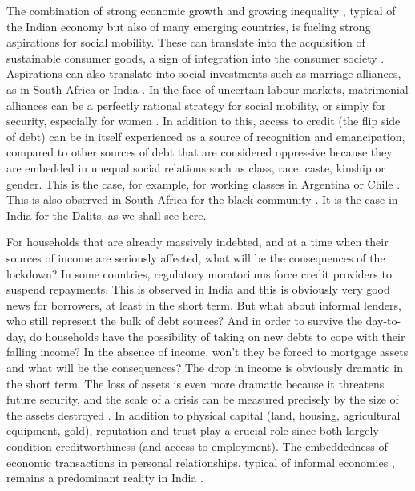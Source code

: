 \documentclass[a4paper, 11pt, onecolumn]{article}
\begin{document}
The combination of strong economic growth and growing inequality \citep{Chancel2019}, typical of the Indian economy but also of many emerging countries, is fueling strong aspirations for social mobility. 
These can translate into the acquisition of sustainable consumer goods, a sign of integration into the consumer society \citep{Saiag2020, Gonzalez2015}. 
Aspirations can also translate into social investments such as marriage alliances, as in South Africa or India \citep{James2015, Srinivasan2005}. 
In the face of uncertain labour markets, matrimonial alliances can be a perfectly rational strategy for social mobility, or simply for security, especially for women \citep{DeNeve2016}. 
In addition to this, access to credit (the flip side of debt) can be in itself experienced as a source of recognition and emancipation, compared to other sources of debt that are considered oppressive because they are embedded in unequal social relations such as class, race, caste, kinship or gender. This is the case, for example, for working classes in Argentina \citep{Saiag2020} or Chile \citep{Gonzalez2015}. 
This is also observed in South Africa for the black community \citep{James2015}. 
It is the case in India for the Dalits, as we shall see here.

For households that are already massively indebted, and at a time when their sources of income are seriously affected, what will be the consequences of the lockdown?
In some countries, regulatory moratoriums force credit providers to suspend repayments. 
This is observed in India and this is obviously very good news for borrowers, at least in the short term. 
But what about informal lenders, who still represent the bulk of debt sources? 
And in order to survive the day-to-day, do households have the possibility of taking on new debts to cope with their falling income? 
In the absence of income, won't they be forced to mortgage assets and what will be the consequences? 
The drop in income is obviously dramatic in the short term. 
The loss of assets is even more dramatic because it threatens future security, and the scale of a crisis can be measured precisely by the size of the assets destroyed \citep{Rhyne2020}.
In addition to physical capital (land, housing, agricultural equipment, gold), reputation and trust play a crucial role since both largely condition creditworthiness (and access to employment). 
The embeddedness of economic transactions in personal relationships, typical of informal economies \citep{Platteau1994, Hart2000}, remains a predominant reality in India \citep{Harriss-White2003}.
\end{document}
